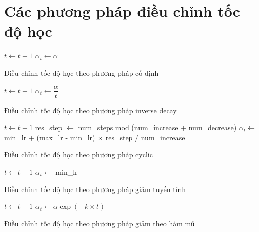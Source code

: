 \documentclass[14pt, a4paper]{article}
\theoremstyle{sltheorem}
\theoremstyle{soltheorem}
\begin{document}
\section{Các phương pháp điều chỉnh tốc độ học} \label{LRScheduler}


\begin{algorithm}[h!]
    \DontPrintSemicolon
     {
        $t \gets t + 1$\;
        $\alpha_t \gets \alpha$\;
    }
    \caption{Điều chỉnh tốc độ học theo phương pháp cố định}
\end{algorithm}


\begin{algorithm}[h!]
    \DontPrintSemicolon
     {
        $t \gets t + 1$\;
        $\alpha_t \gets \dfrac{\alpha}{t}$\;
    }
    \caption{Điều chỉnh tốc độ học theo phương pháp inverse decay}
\end{algorithm}


\begin{algorithm}[h!]
    \DontPrintSemicolon
     {
        $t \gets t + 1$\;
        res\_step $\gets$ num\_steps mod (num\_increase + num\_decrease)\;
         {
            $\alpha_t \gets$  min\_lr + (max\_lr - min\_lr) $\times$ res\_step / num\_increase\;
        } 
    }
    \caption{Điều chỉnh tốc độ học theo phương pháp cyclic}
\end{algorithm}


\begin{algorithm}[h!]
    \DontPrintSemicolon
     {
        $t \gets t + 1$\;
         {
            $\alpha_t \gets$ min\_lr\;
        } 
    }
    \caption{Điều chỉnh tốc độ học theo phương pháp giảm tuyến tính}
\end{algorithm}

\begin{algorithm}[h!]
    \DontPrintSemicolon
     {
        $t \gets t + 1$\;
        $\alpha_t \gets \alpha \exp(-k \times t)$\;
    }
    \caption{Điều chỉnh tốc độ học theo phương pháp giảm theo hàm mũ}
\end{algorithm}
\end{document}
